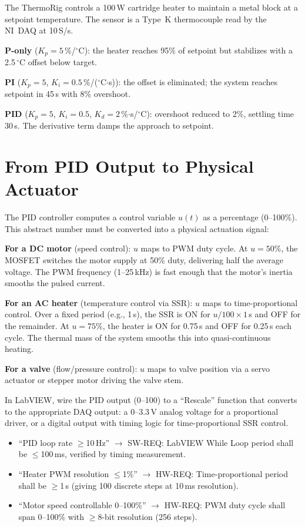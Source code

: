 \documentclass[11pt,letterpaper,twoside,openany]{book}
\newcommand{\degC}{\ensuremath{{}^{\circ}\text{C}}}
\begin{document}
\begin{examplebox}
The ThermoRig controls a 100\,W cartridge heater to maintain a metal block at a setpoint temperature. The sensor is a Type~K thermocouple read by the NI~DAQ at 10\,S/s.

\textbf{P-only} ($K_p = 5$\,\%/\degC{}): the heater reaches 95\% of setpoint but stabilizes with a 2.5\,\degC{} offset below target.

\textbf{PI} ($K_p = 5$, $K_i = 0.5$\,\%/(\degC{}$\cdot$s)): the offset is eliminated; the system reaches setpoint in 45\,s with 8\% overshoot.

\textbf{PID} ($K_p = 5$, $K_i = 0.5$, $K_d = 2$\,\%$\cdot$s/\degC{}): overshoot reduced to 2\%, settling time 30\,s. The derivative term damps the approach to setpoint.
\end{examplebox}


\section{From PID Output to Physical Actuator}
The PID controller computes a control variable $u(t)$ as a percentage (0--100\%). This abstract number must be converted into a physical actuation signal:

\textbf{For a DC motor} (speed control): $u$ maps to PWM duty cycle. At $u = 50\%$, the MOSFET switches the motor supply at 50\% duty, delivering half the average voltage. The PWM frequency (1--25\,kHz) is fast enough that the motor's inertia smooths the pulsed current.

\textbf{For an AC heater} (temperature control via SSR): $u$ maps to time-proportional control. Over a fixed period (e.g., 1\,s), the SSR is ON for $u/100 \times 1$\,s and OFF for the remainder. At $u = 75\%$, the heater is ON for 0.75\,s and OFF for 0.25\,s each cycle. The thermal mass of the system smooths this into quasi-continuous heating.

\textbf{For a valve} (flow/pressure control): $u$ maps to valve position via a servo actuator or stepper motor driving the valve stem.

In LabVIEW, wire the PID output (0--100) to a ``Rescale'' function that converts to the appropriate DAQ output: a 0--3.3\,V analog voltage for a proportional driver, or a digital output with timing logic for time-proportional SSR control.

\begin{keyconceptbox}
\begin{itemize}[nosep,leftmargin=1.5em]
\item ``PID loop rate $\geq$10\,Hz'' $\to$ SW-REQ: LabVIEW While Loop period shall be $\leq$100\,ms, verified by timing measurement.
\item ``Heater PWM resolution $\leq$1\%'' $\to$ HW-REQ: Time-proportional period shall be $\geq$1\,s (giving 100 discrete steps at 10\,ms resolution).
\item ``Motor speed controllable 0--100\%'' $\to$ HW-REQ: PWM duty cycle shall span 0--100\% with $\geq$8-bit resolution (256 steps).
\end{itemize}
\end{keyconceptbox}
\end{document}
